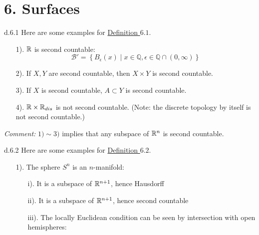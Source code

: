 \section*{6. Surfaces}

\begin{customexa}{d.6.1} Here are some examples for \hypertarget{ex.d.6.1}{\hyperlink{Definition_6.1}{Definition $6.1$}}.
\begin{enumerate}
    \item[1).] $\mathbb{R}$ is second countable:
                $$\mathcal{B}' = \left\{B_{\epsilon}(x) \mid x\in \mathbb{Q}, \epsilon \in \mathbb{Q} \cap (0, \infty)\right\}$$
    \item[2).] If $X, Y$ are second countable, then $X \times Y$ is second countable.
    \item[3).] If $X$ is second countable, $A \subset Y$ is second countable.
    \item[4).] $\mathbb{R} \times \mathbb{R}_{dis}$ is not second countable. (Note: the discrete topology by itself is not second countable.)
\end{enumerate}
\emph{Comment:} $1) \sim 3)$ implies that any subspace of $\mathbb{R}^n$ is second countable.
\end{customexa}

\begin{customexa}{d.6.2} Here are some examples for \hypertarget{ex.d.6.2}{\hyperlink{Definition_6.2}{Definition $6.2$}}.
\begin{enumerate}
    \item[1).] The sphere $S^n$ is an $n$-manifold:
        \begin{enumerate}
            \item[i).] It is a subspace of $\mathbb{R}^{n + 1}$, hence Hausdorff
            \item[ii).] It is a subspace of $\mathbb{R}^{n + 1}$, hence second countable
            \item[iii).] The locally Euclidean condition can be seen by intersection with open hemispheres:
        \end{enumerate}
\end{enumerate}
\end{customexa}